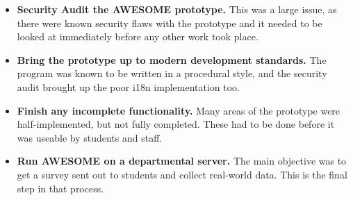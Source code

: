 	\begin{itemize}
		\item \textbf{Security Audit the \ac{AWESOME} prototype.} This was a large issue, as there were known security flaws with the prototype and it needed to be looked at immediately before any other work took place.
		\item \textbf{Bring the prototype up to modern development standards.} The program was known to be written in a procedural style, and the security audit brought up the poor \ac{i18n} implementation too.
		\item \textbf{Finish any incomplete functionality.} Many areas of the prototype were half-implemented, but not fully completed. These had to be done before it was useable by students and staff.
		\item \textbf{Run \ac{AWESOME} on a departmental server.} The main objective was to get a survey sent out to students and collect real-world data. This is the final step in that process.
	\end{itemize}

